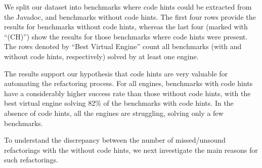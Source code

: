 \documentclass[sigconf]{acmart}
\begin{document}
We split our dataset into benchmarks where code hints could be extracted from the Javadoc, and benchmarks without code hints.
The first four rows provide the results for benchmarks without code hints, whereas the last four (marked with ``(CH)'') show the results for those
benchmarks where code hints were present. The rows denoted by ``Best Virtual Engine'' count all benchmarks (with and without code hints, respectively)
solved by at least one engine.

The results support our hypothesis that code hints are very valuable for automating the refactoring process.
For all engines, benchmarks with code hints have a considerably higher success rate than those without code hints, with the best virtual
engine solving 82\% of the benchmarks with code hints. In the absence of code hints, all the engines are struggling, solving only a few benchmarks.

To understand the discrepancy between the number of missed/unsound refactorings with the without code hints,
we next investigate the main reasons for such refactorings.




%
%
\end{document}
